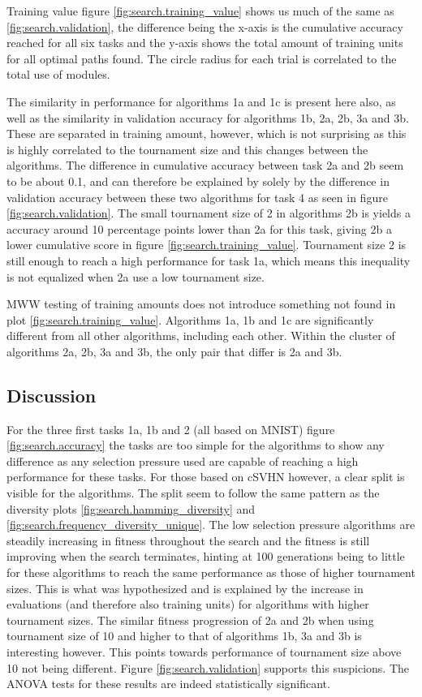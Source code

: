 Training value figure \ref{fig:search.training_value} shows us much of the same as \ref{fig:search.validation}, the difference being the x-axis is the cumulative accuracy reached for all six tasks and the y-axis shows the total amount of training units for all optimal paths found. The circle radius for each trial is correlated to the total use of modules. 

The similarity in performance for algorithms 1a and 1c is present here also, as well as the similarity in validation accuracy for algorithms 1b, 2a, 2b, 3a and 3b. These are separated in training amount, however, which is not surprising as this is highly correlated to the tournament size and this changes between the algorithms. The difference in cumulative accuracy between task 2a and 2b seem to be about 0.1, and can therefore be explained by solely by the difference in validation accuracy between these two algorithms for task 4 as seen in figure \ref{fig:search.validation}. The small tournament size of 2 in algorithms 2b is yields a accuracy around 10 percentage points lower than 2a for this task, giving 2b a lower cumulative score in figure \ref{fig:search.training_value}. Tournament size 2 is still enough to reach a high performance for task 1a, which means this inequality is not equalized when 2a use a low tournament size. 

MWW testing of training amounts does not introduce something not found in plot \ref{fig:search.training_value}. Algorithms 1a, 1b and 1c are significantly different from all other algorithms, including each other. Within the cluster of algorithms 2a, 2b, 3a and 3b, the only pair that differ is 2a and 3b. 

\subsection{Discussion}
For the three first tasks 1a, 1b and 2 (all based on MNIST) figure \ref{fig:search.accuracy} the tasks are too simple for the algorithms to show any difference as any selection pressure used are capable of reaching a high performance for these tasks. For those based on cSVHN however, a clear split is visible for the algorithms. The split seem to follow the same pattern as the diversity plots \ref{fig:search.hamming_diversity} and \ref{fig:search.frequency_diversity_unique}. The low selection pressure algorithms are steadily increasing in fitness throughout the search and the fitness is still improving when the search terminates, hinting at 100 generations being to little for these algorithms to reach the same performance as those of higher tournament sizes. This is what was hypothesized and is explained by the increase in evaluations (and therefore also training units) for algorithms with higher tournament sizes. The similar fitness progression of 2a and 2b when using tournament size of 10 and higher to that of algorithms 1b, 3a and 3b is interesting however. This points towards performance of tournament size above 10 not being different. Figure \ref{fig:search.validation} supports this suspicions. The ANOVA tests for these results are indeed statistically significant.

